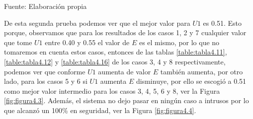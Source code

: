 \begin{center}
\begin{table}[H]
\centering
\caption{\small{Resultados para obtener U1 en el caso 8.}}
\label{table:tabla4.16}
\vskip 0.2cm
\begin{center}
\vskip 0.2cm
{\small{Fuente: Elaboración propia}}
\end{center}
\end{table}
\end{center}

De esta segunda prueba podemos ver que el mejor valor para $U1$ es 0.51. Esto porque, observamos que para los resultados de los casos 1, 2 y 7 cualquier valor que tome $U1$ entre 0.40 y 0.55 el valor de $E$ es el mismo, por lo que no tomaremos en cuenta estos casos, entonces de las tablas \ref{table:tabla4.11}, \ref{table:tabla4.12} y \ref{table:tabla4.16} de los casos 3, 4 y 8 respectivamente, podemos ver que conforme $U1$ aumenta de valor $E$ también aumenta, por otro lado, para los casos 5 y 6 si $U1$ aumenta $E$ disminuye, por ello se escogió a 0.51 como mejor valor intermedio para los casos 3, 4, 5, 6 y 8, ver la Figura \ref{fig:figura4.3}. Además, el sistema no dejo pasar en ningún caso a intrusos por lo que alcanzó un 100\% en seguridad, ver la Figura \ref{fig:figura4.4}.

